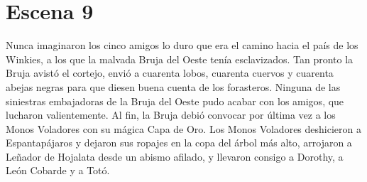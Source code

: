 \chapter{Escena 9}
Nunca imaginaron los cinco amigos lo duro que era el camino hacia el país de los Winkies, a los que la malvada Bruja del Oeste tenía esclavizados.
Tan pronto la Bruja avistó el cortejo, envió a cuarenta lobos, cuarenta cuervos y cuarenta abejas negras para que diesen buena cuenta de los forasteros. Ninguna de las siniestras embajadoras de la Bruja del Oeste pudo acabar con los amigos, que lucharon valientemente.
Al fin, la Bruja debió convocar por última vez a los Monos Voladores con su mágica Capa de Oro.
Los Monos Voladores deshicieron a Espantapájaros y dejaron sus ropajes en la copa del árbol más alto, arrojaron a Leñador de Hojalata desde un abismo afilado, y llevaron consigo a Dorothy, a León Cobarde y a Totó.